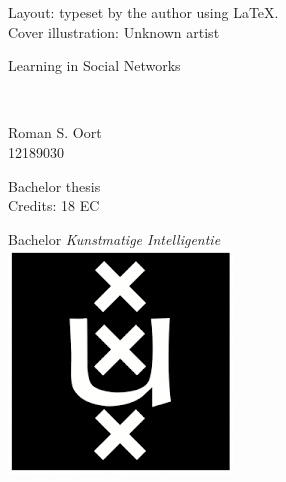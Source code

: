 \documentclass[a4paper, 12pt]{report}
\newcommand{\theTitle}{Learning in Social Networks}
\newcommand{\theSubTitle}{}
\newcommand{\theAuthor}{Roman S. Oort}
\newcommand{\theStudentID}{12189030}
\begin{document}
    \restoregeometry
    
\newpage

\thispagestyle{empty}
\vspace*{0.8\textheight}
\noindent
Layout: typeset by the author using \LaTeX. \\
Cover illustration: Unknown artist 
\restoregeometry

\newpage
\thispagestyle{empty}
\begin{center}

\vspace{2.5cm}


\begin{Huge}
\theTitle
\end{Huge} \\

\vspace{0.5 cm}

\begin{Large}
\theSubTitle
\end{Large}

\vspace{1.5cm}

\theAuthor\\
\theStudentID

\vspace{1.5cm}

Bachelor thesis\\
Credits: 18 EC

\vspace{0.5cm}

Bachelor \textit{Kunstmatige Intelligentie} \\
\vspace{0.25cm}
\includegraphics[width=0.075\paperwidth]{ThesisKI/UvAThesisLayout/uva_logo.png} \\
\vspace{0.1cm}


\end{center}
\end{document}
